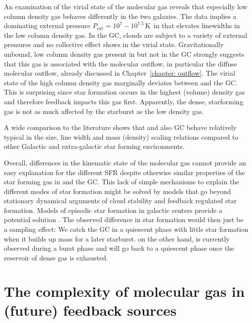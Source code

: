 An examination of the virial state of the molecular gas reveals that especially low column density gas behaves differently in the two galaxies. The data implies a dominating external pressure $P_\mathrm{ext} = 10^7-10^{7.5}$\,K\, in  that elevates linewidths in the low column density gas. In the GC, clouds are subject to a variety of external pressures and no collective effect shows in the virial state.
Gravitationally unbound, low column density gas present in  but not in the GC strongly suggests that this gas is associated with the molecular outflow, in particular the diffuse molecular outflow, already discussed in Chapter~\ref{chapter: outflow}.
The virial state of the high column density gas marginally deviates between  and the GC. This is surprising since star formation occurs in the highest (volume) density gas and therefore feedback impacts this gas first. Apparently, the dense, starforming gas is not as much affected by the starburst as the low density gas.

A wide comparison to the literature shows that  and also GC behave relatively typical in the size, line width and mass (density) scaling relations compared to other Galactic and extra-galactic star forming environments.

Overall, differences in the kinematic state of the molecular gas cannot provide an easy explanation for the different SFR despite otherwise similar properties of the star forming gas in  and the GC.
This lack of simple mechanisms to explain the different modes of star formation might be solved by models that go beyond stationary dynamical arguments of cloud stability and feedback regulated star formation.
Models of episodic star formation in galactic centers provide a potential solution \citep[e.g.][]{2015MNRAS.453..739K,2019MNRAS.484.1213S}.
The observed difference in star formation would then just be a sampling effect: We catch the GC in a quiescent phase with little star formation when it builds up mass for a later starburst.  on the other hand, is currently observed during a burst phase and will go back to a quiescent phase once the reservoir of dense gas is exhausted.


\section{The complexity of molecular gas in (future) feedback sources}

